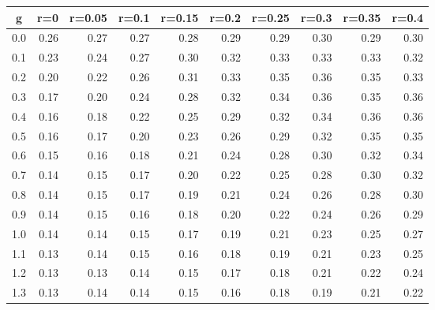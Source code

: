 %
\begin{table}[!tbp]
 \begin{center}
 \begin{tabular}{rrrrrrrrrr}\hline\hline
\multicolumn{1}{c}{g}&\multicolumn{1}{c}{r=0}&\multicolumn{1}{c}{r=0.05}&\multicolumn{1}{c}{r=0.1}&\multicolumn{1}{c}{r=0.15}&\multicolumn{1}{c}{r=0.2}&\multicolumn{1}{c}{r=0.25}&\multicolumn{1}{c}{r=0.3}&\multicolumn{1}{c}{r=0.35}&\multicolumn{1}{c}{r=0.4}\tabularnewline
\hline
0.0&0.26&0.27&0.27&0.28&0.29&0.29&0.30&0.29&0.30\tabularnewline
0.1&0.23&0.24&0.27&0.30&0.32&0.33&0.33&0.33&0.32\tabularnewline
0.2&0.20&0.22&0.26&0.31&0.33&0.35&0.36&0.35&0.33\tabularnewline
0.3&0.17&0.20&0.24&0.28&0.32&0.34&0.36&0.35&0.36\tabularnewline
0.4&0.16&0.18&0.22&0.25&0.29&0.32&0.34&0.36&0.36\tabularnewline
0.5&0.16&0.17&0.20&0.23&0.26&0.29&0.32&0.35&0.35\tabularnewline
0.6&0.15&0.16&0.18&0.21&0.24&0.28&0.30&0.32&0.34\tabularnewline
0.7&0.14&0.15&0.17&0.20&0.22&0.25&0.28&0.30&0.32\tabularnewline
0.8&0.14&0.15&0.17&0.19&0.21&0.24&0.26&0.28&0.30\tabularnewline
0.9&0.14&0.15&0.16&0.18&0.20&0.22&0.24&0.26&0.29\tabularnewline
1.0&0.14&0.14&0.15&0.17&0.19&0.21&0.23&0.25&0.27\tabularnewline
1.1&0.13&0.14&0.15&0.16&0.18&0.19&0.21&0.23&0.25\tabularnewline
1.2&0.13&0.13&0.14&0.15&0.17&0.18&0.21&0.22&0.24\tabularnewline
1.3&0.13&0.14&0.14&0.15&0.16&0.18&0.19&0.21&0.22\tabularnewline
\hline
\end{tabular}

\end{center}

\end{table}


